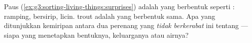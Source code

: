 \begin{exercise}[$\star\star\star$]\label{exo:g4:adapted-to-their-world:11}
Paus (\cref{ex:g3:sorting-living-things:surprises}) adalah 
yang berbentuk seperti : ramping, bersirip, licin.  trout
adalah  yang berbentuk sama. Apa yang ditunjukkan kemiripan antara
dua perenang yang \emph{tidak berkerabat} ini tentang  ---
siapa yang menetapkan bentuknya, keluarganya atau airnya?
\end{exercise}
